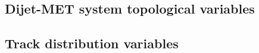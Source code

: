 \subsection{Dijet-MET system topological variables}


\subsection{Track distribution variables}


% 
% 
% 


% 
% 


